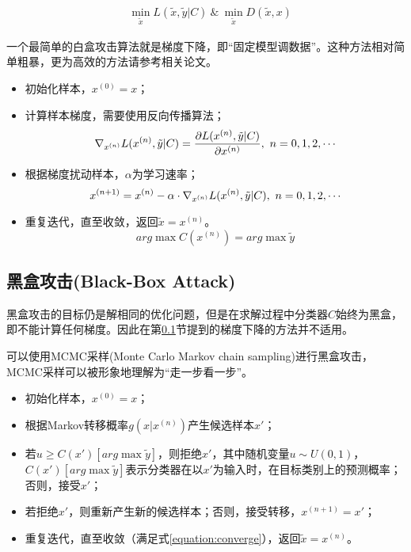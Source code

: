 \documentclass[journal, a4paper]{IEEEtran}
\begin{document}
\begin{align}
    &\min_{\tilde x} L(\tilde x,\tilde y|C)\ \&\ \min_{\tilde x} D(\tilde x, x) \label{equation:min}
\end{align}

一个最简单的白盒攻击算法就是梯度下降，即``固定模型调数据''。这种方法相对简单粗暴，更为高效的方法请参考相关论文。

\begin{itemize}
    \item 初始化样本，$x^{(0)}=x$；
    \item 计算样本梯度，需要使用反向传播算法；
\begin{equation}
    \nabla_{x^{(n)}}L(x^{(n)},\tilde y|C)=\frac{\partial L(x^{(n)},\tilde y|C)}{\partial x^{(n)}},\ n=0,1,2,\cdots \notag
\end{equation}
    \item 根据梯度扰动样本，$\alpha$为学习速率；
\begin{equation}
    x^{(n+1)}=x^{(n)}-\alpha\cdot\nabla_{x^{(n)}}L(x^{(n)},\tilde y|C),\ n=0,1,2,\cdots \notag
\end{equation}
    \item 重复迭代，直至收敛，返回$\tilde x=x^{(n)}$。
\begin{equation}
    arg\max C(x^{(n)})=arg\max \tilde y \label{equation:converge}
\end{equation}
\end{itemize}

\subsection{黑盒攻击(Black-Box Attack)}
\label{section:adversarial attack;subsection:black-box}

黑盒攻击的目标仍是解相同的优化问题，但是在求解过程中分类器$C$始终为黑盒，即不能计算任何梯度。因此在第\ref{section:adversarial attack;subsection:black-box}节提到的梯度下降的方法并不适用。

可以使用MCMC采样(Monte Carlo Markov chain sampling)进行黑盒攻击，MCMC采样可以被形象地理解为``走一步看一步''。

\begin{itemize}
    \item 初始化样本，$x^{(0)}=x$；
    \item 根据Markov转移概率$g(x|x^{(n)})$产生候选样本$x'$；
    \item 若$u\ge C(x')[arg\max \tilde y]$，则拒绝$x'$，其中随机变量$u\sim U(0,1)$，$C(x')[arg\max \tilde y]$表示分类器在以$x'$为输入时，在目标类别上的预测概率；否则，接受$x'$；
    \item 若拒绝$x'$，则重新产生新的候选样本；否则，接受转移，$x^{(n+1)}=x'$；
    \item 重复迭代，直至收敛（满足式\ref{equation:converge}），返回$\tilde x=x^{(n)}$。
\end{itemize}
\end{document}
